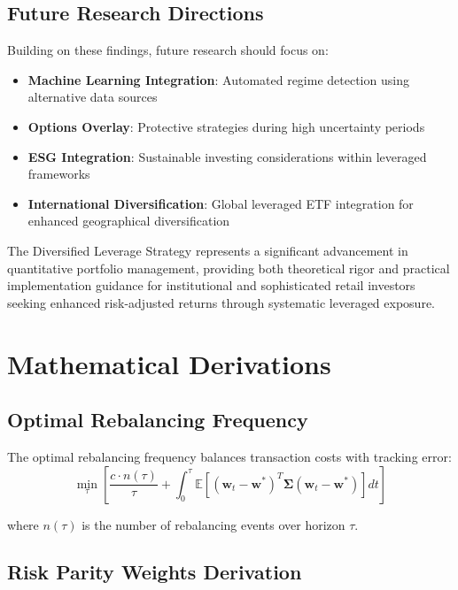 \documentclass[onecolumn,ieee]{arithmaxresearch}
\begin{document}
\subsection{Future Research Directions}

Building on these findings, future research should focus on:
\begin{itemize}
    \item \textbf{Machine Learning Integration}: Automated regime detection using alternative data sources
    \item \textbf{Options Overlay}: Protective strategies during high uncertainty periods
    \item \textbf{ESG Integration}: Sustainable investing considerations within leveraged frameworks
    \item \textbf{International Diversification}: Global leveraged ETF integration for enhanced geographical diversification
\end{itemize}

The Diversified Leverage Strategy represents a significant advancement in quantitative portfolio management, providing both theoretical rigor and practical implementation guidance for institutional and sophisticated retail investors seeking enhanced risk-adjusted returns through systematic leveraged exposure.

\appendix

\section{Mathematical Derivations}

\subsection{Optimal Rebalancing Frequency}

The optimal rebalancing frequency balances transaction costs with tracking error:
\begin{equation}
\min_\tau \left[ \frac{c \cdot n(\tau)}{\tau} + \int_0^\tau \mathbb{E}[(\mathbf{w}_t - \mathbf{w}^*)^T \boldsymbol{\Sigma} (\mathbf{w}_t - \mathbf{w}^*)] dt \right]
\end{equation}

where $n(\tau)$ is the number of rebalancing events over horizon $\tau$.

\subsection{Risk Parity Weights Derivation}
\end{document}
